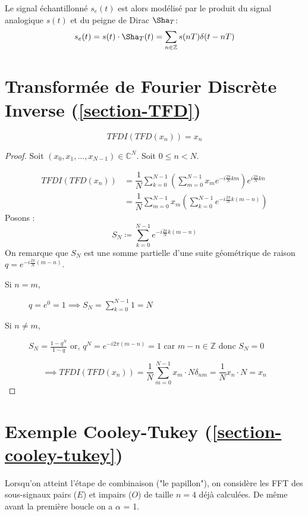 Le signal échantillonné $s_e(t)$ est alors modélisé par le produit du signal analogique $s(t)$ et du peigne de Dirac $\Sha_{T}$:
\begin{align*}
    s_e(t) = s(t) \cdot \Sha_{T}(t) = \sum_{n\in\mathbb{Z}} s(nT) \delta(t - nT)
\end{align*}

\pagebreak

\section*{Transformée de Fourier Discrète Inverse (\ref{section-TFD})}
\label{preuve-TFDI}

$$TFDI(TFD(x_n)) = x_n$$
\begin{proof}
    Soit $(x_0,x_1,...,x_{N-1}) \in \mathbb{C}^N$. Soit $0 \leq n < N$.

    \begin{align*}
        TFDI(TFD(x_n))&=\dfrac{1}{N} \sum_{k=0}^{N-1} \left(\sum_{m=0}^{N-1} x_m e^{-i \frac{2\pi}{N} km}\right) e^{i \frac{2 \pi}{N}kn} \\
        &= \dfrac{1}{N} \sum_{m=0}^{N-1} x_m \left( \sum_{k=0}^{N-1} e^{-i \frac{2\pi}{N} k(m-n)} \right)
    \end{align*}
    Posons :
    $$S_N \coloneq \sum_{k=0}^{N-1}e^{-i \frac{2\pi}{N} k(m-n)}$$
    On remarque que $S_N$ est une somme partielle d'une suite géométrique de raison $q = e^{-i \frac{2\pi}{N} (m-n)}$.
    \begin{description}
        \item[Si $n=m$, ] $q = e^0 = 1 \implies S_N = \sum_{k=0}^{N-1} 1 = N$  
        \item[Si $n\neq m$, ] $S_N=\frac{1-q^N}{1-q}$ or, $q^N = e^{-i2\pi(m-n)} = 1$ car $m-n\in \mathbb{Z}$ donc $S_N = 0$ 
    \end{description}
    $$\implies TFDI(TFD(x_n)) =\dfrac{1}{N}\sum_{m=0}^{N-1}x_m \cdot N \delta_{nm} = \dfrac{1}{N}x_n\cdot N = x_n$$
\end{proof}

\pagebreak

\section*{Exemple Cooley-Tukey (\ref{section-cooley-tukey})}
\label{exemple-cooley}

Lorsqu'on atteint l'étape de combinaison ("le papillon"), on considère les FFT des sous-signaux pairs ($E$) et impairs ($O$) de taille $n=4$ déjà calculées. 
De même avant la première boucle on a $\alpha$ = 1.


